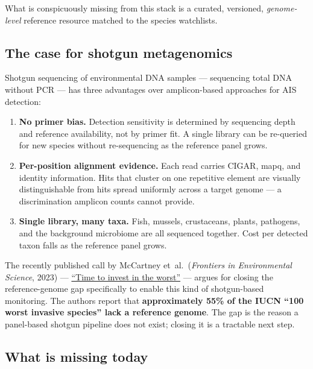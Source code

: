\documentclass[11pt, letterpaper]{article}
\begin{document}
What is conspicuously missing from this stack is a curated, versioned, \emph{genome-level} reference resource matched to the species watchlists.

\subsection{The case for shotgun metagenomics}

Shotgun sequencing of environmental DNA samples --- sequencing total DNA without PCR --- has three advantages over amplicon-based approaches for AIS detection:

\begin{enumerate}[leftmargin=1.5em]
  \item \textbf{No primer bias.} Detection sensitivity is determined by sequencing depth and reference availability, not by primer fit. A single library can be re-queried for new species without re-sequencing as the reference panel grows.
  \item \textbf{Per-position alignment evidence.} Each read carries CIGAR, mapq, and identity information. Hits that cluster on one repetitive element are visually distinguishable from hits spread uniformly across a target genome --- a discrimination amplicon counts cannot provide.
  \item \textbf{Single library, many taxa.} Fish, mussels, crustaceans, plants, pathogens, and the background microbiome are all sequenced together. Cost per detected taxon falls as the reference panel grows.
\end{enumerate}

The recently published call by McCartney et~al.\ (\textit{Frontiers in Environmental Science}, 2023) --- \href{https://www.frontiersin.org/journals/environmental-science/articles/10.3389/fenvs.2023.1258880/full}{``Time to invest in the worst''} --- argues for closing the reference-genome gap specifically to enable this kind of shotgun-based monitoring. The authors report that \textbf{approximately 55\% of the IUCN ``100 worst invasive species'' lack a reference genome}. The gap is the reason a panel-based shotgun pipeline does not exist; closing it is a tractable next step.

\subsection{What is missing today}
\end{document}
